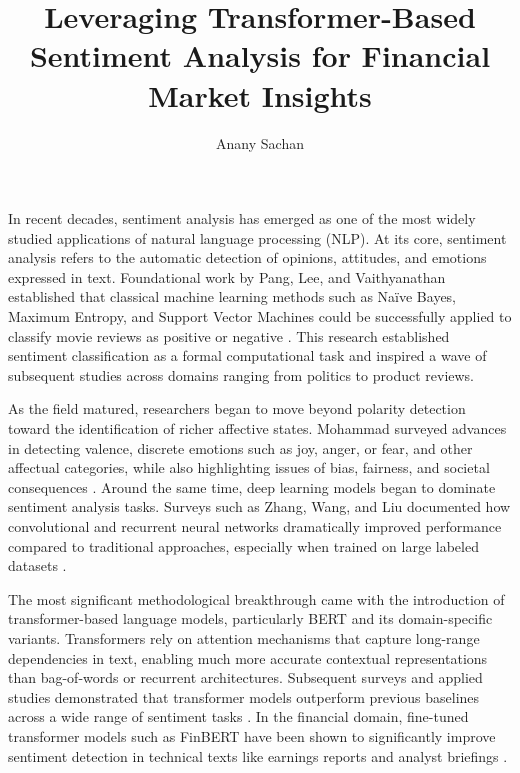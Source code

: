\documentclass[12pt]{article}
\title{\textbf{Leveraging Transformer-Based Sentiment Analysis for Financial Market Insights}}
\author{Anany Sachan}
\begin{document}
\maketitle

In recent decades, sentiment analysis has emerged as one of the most widely studied applications of 
natural language processing (NLP). At its core, sentiment analysis refers to the automatic detection of 
opinions, attitudes, and emotions expressed in text. Foundational work by Pang, Lee, and Vaithyanathan 
established that classical machine learning methods such as Naïve Bayes, Maximum Entropy, and Support 
Vector Machines could be successfully applied to classify movie reviews as positive or negative 
\cite{10.3115/1118693.1118704}. This research established sentiment classification as a formal 
computational task and inspired a wave of subsequent studies across domains ranging from politics to 
product reviews.

As the field matured, researchers began to move beyond polarity detection toward the identification of 
richer affective states. Mohammad surveyed advances in detecting valence, discrete emotions such as joy, 
anger, or fear, and other affectual categories, while also highlighting issues of bias, fairness, and 
societal consequences \cite{SentimentEmotionSurvey2021}. Around the same time, deep learning models 
began to dominate sentiment analysis tasks. Surveys such as Zhang, Wang, and Liu documented how 
convolutional and recurrent neural networks dramatically improved performance compared to traditional 
approaches, especially when trained on large labeled datasets \cite{10.1002/widm.1253}.

The most significant methodological breakthrough came with the introduction of transformer-based 
language models, particularly BERT and its domain-specific variants. Transformers rely on attention 
mechanisms that capture long-range dependencies in text, enabling much more accurate contextual 
representations than bag-of-words or recurrent architectures. Subsequent surveys and applied studies 
demonstrated that transformer models outperform previous baselines across a wide range of sentiment 
tasks \cite{10.1145/3586075,10.1145/3650215.3650260}. In the financial domain, fine-tuned transformer 
models such as FinBERT have been shown to significantly improve sentiment detection in technical texts 
like earnings reports and analyst briefings \cite{10.1145/3543873.3587605,araci2019finbert}.
\end{document}
